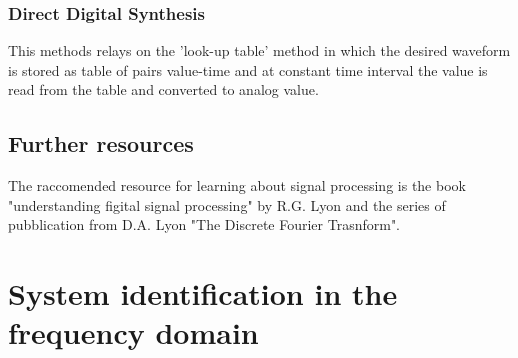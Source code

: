 \subsubsection{Direct Digital Synthesis}

This methods relays on the 'look-up table' method in which the desired waveform is stored as table of pairs value-time and at constant time interval the value is read from the table and converted to analog value.

\subsection{Further resources}

The raccomended resource for learning about signal processing is the book "understanding figital signal processing" by R.G. Lyon and the series of pubblication from D.A. Lyon "The Discrete Fourier Trasnform".


\section{System identification in the frequency domain}
